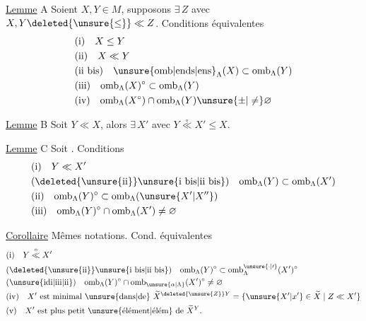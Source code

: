 
\uline{Lemme} A Soient $X,Y\in M$, supposons $\exists\,Z$ avec $X,Y\deleted{\unsure{\leq}}\ll Z$. Conditions équivalentes
\[
 \begin{aligned}
 &\text{(i)}\quad X\leq Y\\
 &\text{(ii)}\quad X\ll Y\\
 &\text{(ii bis)}\quad\unsure{\mathrm{omb}|\mathrm{ends}|\mathrm{ens}}_{\Lambda}(X)\subset\mathrm{omb}_{\Lambda}(Y)\\
 &\text{(iii)}\quad\mathrm{omb}_{\Lambda}(X)^{\circ}\subset\mathrm{omb}_{\Lambda}(Y)\\
 &\text{(iv)}\quad\mathrm{omb}_{\Lambda}(X^{\circ})\cap\mathrm{omb}_{\Lambda}(Y)\unsure{\pm|\ne}\varnothing
 \end{aligned}
\]

\uline{Lemme} B Soit $Y\ll X$, alors $\exists\,X'$ avec $Y\mathrel{\overset{\circ}{\ll}}X'\leq X$.

\uline{Lemme} C Soit
. Conditions 
\[
 \begin{aligned}
 &\text{(i)}\quad Y\ll X'\\
 &\text{(\deleted{\unsure{ii}}\unsure{i bis|ii bis})}\quad\mathrm{omb}_{\Lambda}(Y)\subset\mathrm{omb}_{\Lambda}(X')\\
 &\text{(ii)}\quad\mathrm{omb}_{\Lambda}(Y)^{\circ}\subset\mathrm{omb}_{\Lambda}(\unsure{X'|X''})\\
 &\text{(iii)}\quad\mathrm{omb}_{\Lambda}(Y)^{\circ}\cap\mathrm{omb}_{\Lambda}(X')\ne\varnothing
 \end{aligned}
\]

\uline{Corollaire} Mêmes notations. Cond. équivalentes
\[
 \begin{aligned}
 &\text{(i)}\quad Y\mathrel{\overset{\circ}{\ll}}X'\\
 &\text{(\deleted{\unsure{ii}}\unsure{i bis|ii bis})}\quad\mathrm{omb}_{\Lambda}(Y)^{\circ}\subset\mathrm{omb}_{\Lambda}^{\unsure{\cdot|\prime}}(X')^{\circ}\\
 &\text{(\unsure{idi|iii|ii})}\quad\mathrm{omb}_{\Lambda}(Y)^{\circ}\cap\mathrm{omb}_{\unsure{\alpha|\Lambda}}(X')^{\circ}\ne\varnothing\\
 &\text{(iv)}\quad X'\text{ est minimal \unsure{dans|de} }\widetilde X^{\deleted{\unsure{Z}}Y}
   =\{\unsure{X'|x'}\in\widetilde X\mid Z\ll X'\}\\
 &\text{(v)}\quad X'\text{ est plus petit \unsure{élément|élém} de }\widetilde X^{Y}.
 \end{aligned}
\]

